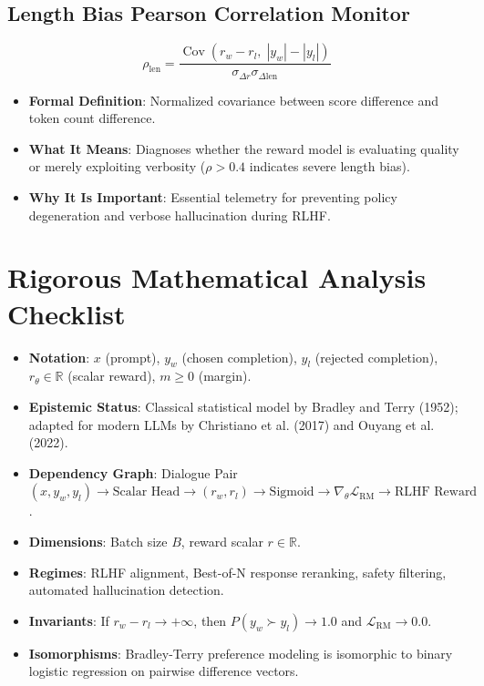 \documentclass[11pt,a4paper]{article}
\theoremstyle{definition}
\begin{document}
\subsection{Length Bias Pearson Correlation Monitor}
{\boldmath
\begin{equation}
\rho_{\text{len}} = \frac{\operatorname{Cov}(r_w - r_l, \; |y_w| - |y_l|)}{\sigma_{\Delta r} \sigma_{\Delta \text{len}}}
\end{equation}
}
\begin{itemize}
    \item \textbf{Formal Definition}: Normalized covariance between score difference and token count difference.
    \item \textbf{What It Means}: Diagnoses whether the reward model is evaluating quality or merely exploiting verbosity ($\rho > 0.4$ indicates severe length bias).
    \item \textbf{Why It Is Important}: Essential telemetry for preventing policy degeneration and verbose hallucination during RLHF.
\end{itemize}

\section{Rigorous Mathematical Analysis Checklist}

\begin{itemize}
    \item \textbf{Notation}: $x$ (prompt), $y_w$ (chosen completion), $y_l$ (rejected completion), $r_\theta \in \mathbb{R}$ (scalar reward), $m \ge 0$ (margin).
    \item \textbf{Epistemic Status}: Classical statistical model by Bradley and Terry (1952); adapted for modern LLMs by Christiano et al. (2017) and Ouyang et al. (2022).
    \item \textbf{Dependency Graph}: Dialogue Pair $(x, y_w, y_l) \to \text{Scalar Head} \to (r_w, r_l) \to \text{Sigmoid} \to \nabla_\theta \mathcal{L}_{\text{RM}} \to \text{RLHF Reward}$.
    \item \textbf{Dimensions}: Batch size $B$, reward scalar $r \in \mathbb{R}$.
    \item \textbf{Regimes}: RLHF alignment, Best-of-N response reranking, safety filtering, automated hallucination detection.
    \item \textbf{Invariants}: If $r_w - r_l \to +\infty$, then $P(y_w \succ y_l) \to 1.0$ and $\mathcal{L}_{\text{RM}} \to 0.0$.
    \item \textbf{Isomorphisms}: Bradley-Terry preference modeling is isomorphic to binary logistic regression on pairwise difference vectors.
\end{itemize}
\end{document}
